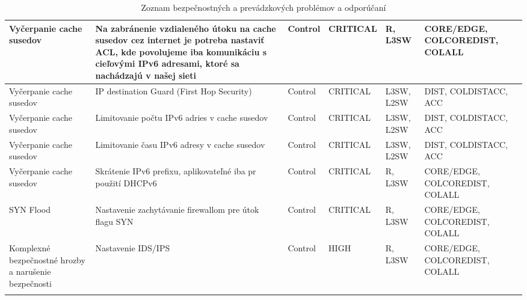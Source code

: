 \begin{longtable}{|P{8em}|P{9em}|P{8em}|P{5em}|P{5em}|P{10em}|}
    Vyčerpanie cache susedov & Na zabránenie vzdialeného útoku na cache susedov cez internet je potreba nastaviť ACL, kde povolujeme iba komunikáciu s cieľovými IPv6 adresami, ktoré sa nachádzajú v našej sieti & Control & CRITICAL & R, L3SW & CORE/EDGE, COLCOREDIST, \hbox{COLALL} \\ \hline
    Vyčerpanie cache susedov & IP destination Guard (First Hop Security) & Control & CRITICAL & L3SW, L2SW & DIST, COLDISTACC, ACC \\ \hline
    Vyčerpanie cache susedov & Limitovanie počtu IPv6 adries v cache susedov & Control & CRITICAL & L3SW, L2SW & DIST, COLDISTACC, ACC \\ \hline
    Vyčerpanie cache susedov & Limitovanie času IPv6 adresy v cache susedov & Control & CRITICAL & L3SW, L2SW & DIST, COLDISTACC, ACC \\ \hline
    Vyčerpanie cache susedov & Skrátenie IPv6 prefixu, aplikovateľné iba pr použití DHCPv6 & Control & CRITICAL & R, L3SW & CORE/EDGE, COLCOREDIST, \hbox{COLALL} \\ \hline
    SYN Flood & Nastavenie zachytávanie firewallom pre útok flagu SYN & Control & CRITICAL & R, L3SW & CORE/EDGE, COLCOREDIST, \hbox{COLALL} \\ \hline
    Komplexné bezpečnostné hrozby a narušenie bezpečnosti & Nastavenie IDS/IPS & Control & HIGH & R, L3SW & CORE/EDGE, COLCOREDIST, \hbox{COLALL} \\ \hline
		
	\caption{Zoznam bezpečnostných a prevádzkových problémov a odporúčaní}
	\label{checklist}\\
\end{longtable}

 




